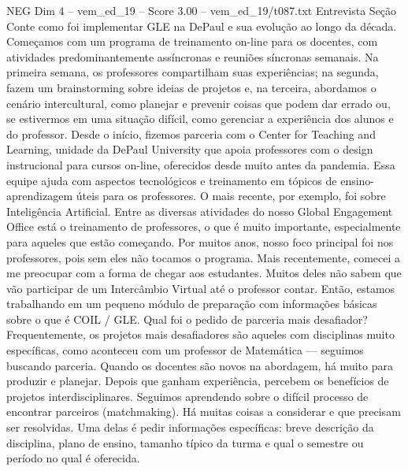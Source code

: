 \begin{textsample}{NEG Dim 4 – vem\_ed\_19 – Score 3.00 – vem\_ed\_19/t087.txt}  \label{ex:f4_neg_061}
Entrevista Seção Conte como foi implementar GLE na DePaul e sua evolução ao longo da década.
Começamos com um programa de treinamento on-line para os docentes, com atividades predominantemente assíncronas e reuniões síncronas semanais.
Na primeira semana, os professores compartilham suas experiências; na segunda, fazem um brainstorming sobre ideias de projetos e, na terceira, abordamos o cenário intercultural, como planejar e prevenir coisas que podem dar errado ou, se estivermos em uma situação difícil, como gerenciar a experiência dos alunos e do professor.
Desde o início, fizemos parceria com o Center for Teaching and Learning, unidade da DePaul University que apoia professores com o design instrucional para cursos on-line, oferecidos desde muito antes da pandemia.
Essa equipe ajuda com aspectos tecnológicos e treinamento em tópicos de ensino-aprendizagem úteis para os professores.
O mais recente, por exemplo, foi sobre Inteligência Artificial.
Entre as diversas atividades do nosso Global Engagement Office está o treinamento de professores, o que é muito importante, especialmente para aqueles que estão começando.
Por muitos anos, nosso foco principal foi nos professores, pois sem eles não tocamos o programa.
Mais recentemente, comecei a me preocupar com a forma de chegar aos estudantes.
Muitos deles não sabem que vão participar de um Intercâmbio Virtual até o professor contar.
Então, estamos trabalhando em um pequeno módulo de preparação com informações básicas sobre o que é COIL / GLE.
Qual foi o pedido de parceria mais desafiador?
Frequentemente, os projetos mais desafiadores são aqueles com disciplinas muito específicas, como aconteceu com um professor de Matemática — seguimos buscando parceria.
Quando os docentes são novos na abordagem, há muito para produzir e planejar.
Depois que ganham experiência, percebem os benefícios de projetos interdisciplinares.
Seguimos aprendendo sobre o difícil processo de encontrar parceiros (matchmaking).
Há muitas coisas a considerar e que precisam ser resolvidas.
Uma delas é pedir informações específicas: breve descrição da disciplina, plano de ensino, tamanho típico da turma e qual o semestre ou período no qual é oferecida.

\end{textsample}
